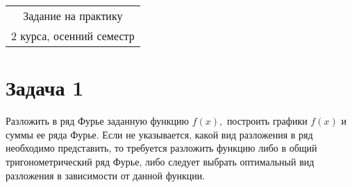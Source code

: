 \documentclass[a4paper,final,12pt]{article}
\begin{document}
\begin{center}
	\Large\bf\em 
	\begin{tabular}{c}
		Задание на практику \\
		2 курса, осенний семестр
	\end{tabular}
\end{center}

	
	
\section*{Задача 1}
Разложить в ряд Фурье заданную функцию $f(x),$ построить графики
$f(x)$ и суммы ее ряда Фурье. Если не указывается, какой вид
разложения в ряд необходимо представить, то требуется
разложить функцию либо в общий тригонометрический ряд Фурье, либо
следует выбрать оптимальный вид разложения в зависимости от данной
функции.
\end{document}
